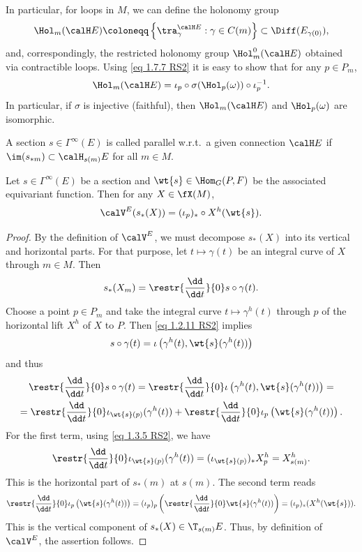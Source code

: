 In  particular, for loops in $M$, we can define the holonomy group
\[\Hol_m(\calH E)\coloneqq \left\{\tra_\gamma^{\calH E}:\gamma\in C(m)\right\}\subset \Diff(E_{\gamma(0)}),\]
and, correspondingly, the restricted holonomy group $\Hol_m^0(\calH E)$ obtained via contractible loops. Using \eqref{eq 1.7.7 RS2} it is easy to show that for any $p\in P_m$,
\[\Hol_m(\calH E)=\iota_p\circ \sigma(\Hol_p(\omega))\circ \iota_p^{-1}.\]
In particular, if $\sigma$ is injective (faithful), then $\Hol_m(\calH E)$ and $\Hol_p(\omega)$ are isomorphic.

\begin{defn}\label{def parallel section}
    A section $s\in\Gamma^\infty(E)$ is called parallel w.r.t.\ a given connection $\calH E$ if $\im(s_{\ast m})\subset \calH_{s(m)}E$ for all $m\in M$.
\end{defn}

\begin{prop}[{{\cite[Prop.~1.5.6]{RS2}}}]\label{prop 1.5.6 RS2 my version}
    Let $s\in\Gamma^\infty(E)$ be a section and $\wt{s}\in\Hom_G(P,F)$ be the associated equivariant function. Then for any $X\in\fX(M)$,
    \[\calV^E(s_\ast(X))=(\iota_p)_\ast\circ X^h(\wt{s}).\]
\end{prop}
\begin{proof}
    By the definition of $\calV^E$, we must decompose $s_\ast(X)$ into its vertical and horizontal parts. For that purpose, let $t\mapsto \gamma(t)$ be an integral curve of $X$ through $m\in M$. Then
    \[s_\ast( X_m)=\restr{\frac{\dd}{\dd t}}{0}s\circ \gamma(t).\]
    Choose a point $p\in P_m$ and take the integral curve $t\mapsto \gamma^h(t)$ through $p$ of the horizontal lift $X^h$ of $X$ to $P$. Then \eqref{eq 1.2.11 RS2} implies
    \[s\circ\gamma(t)=\iota\left(\gamma^h(t),\wt{s}(\gamma^h(t))\right)\]
    and thus
    \begin{multline}
        \restr{\frac{\dd}{\dd t}}{0} s\circ\gamma(t)=\restr{\frac{\dd}{\dd t}}{0} \iota\left(\gamma^h(t),\wt{s}(\gamma^h(t))\right)=\\
        =\restr{\frac{\dd}{\dd t}}{0} \iota_{\wt{s}(p)}(\gamma^h(t))+\restr{\frac{\dd}{\dd t}}{0}\iota_p\left(\wt{s}(\gamma^h(t))\right).
    \end{multline}
    For the first term, using \eqref{eq 1.3.5 RS2}, we have
    \[\restr{\frac{\dd}{\dd t}}{0}\iota_{\wt{s}(p)}(\gamma^h(t))=(\iota_{\wt{s}(p)})_\ast X_p^h=X^h_{s(m)}.\]
    This is the horizontal part of $s_\ast(m)$ at $s(m)$. The second term reads
    \[\restr{\frac{\dd}{\dd t}}{0}\iota_p\left(\wt{s}(\gamma^h(t))\right)= (\iota_p)_p\left(\restr{\frac{\dd}{\dd t}}{0} \wt{s}(\gamma^h(t))\right)=(\iota_p)_\ast(X^h (\wt{s})).\]
    This is the vertical component of $s_\ast(X)\in \T_{s(m)}E$. Thus, by definition of $\calV^E$, the assertion follows.
\end{proof}

